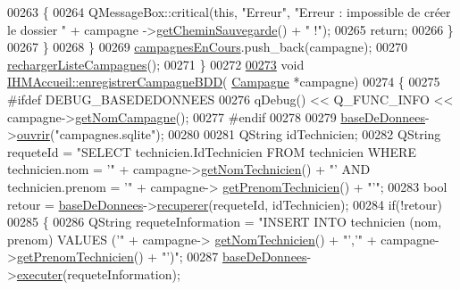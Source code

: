 \begin{DoxyCode}
{00263             \{
00264                 QMessageBox::critical(\textcolor{keyword}{this}, \textcolor{stringliteral}{"Erreur"}, \textcolor{stringliteral}{"Erreur : impossible de créer le dossier "} + campagne
      ->\hyperlink{class_campagne_ad752790357417d83a93056d9c9689a16}{getCheminSauvegarde}() + \textcolor{stringliteral}{" !"});
00265                 \textcolor{keywordflow}{return};
00266             \}
00267         \}
00268     \}
00269     \hyperlink{class_i_h_m_accueil_ad3827b81480eb201b5927c16a2ad1c46}{campagnesEnCours}.push\_back(campagne);
00270     \hyperlink{class_i_h_m_accueil_a44074f2d8d59e0d1b7a3d50c24d2a0df}{rechargerListeCampagnes}();
00271 \}
00272 
\hyperlink{class_i_h_m_accueil_a5ab04fc3fa87817bec130f377d563b75}{00273} \textcolor{keywordtype}{void} \hyperlink{class_i_h_m_accueil_a5ab04fc3fa87817bec130f377d563b75}{IHMAccueil::enregistrerCampagneBDD}(
      \hyperlink{class_campagne}{Campagne} *campagne)
00274 \{
00275 \textcolor{preprocessor}{    #ifdef DEBUG\_BASEDEDONNEES}
00276     qDebug() << Q\_FUNC\_INFO << campagne->\hyperlink{class_campagne_a99a682fcb8e5a3f8c2aff7a44eb2c930}{getNomCampagne}();
00277 \textcolor{preprocessor}{    #endif}
00278 
00279     \hyperlink{class_i_h_m_accueil_ab56d9846c071396a92f88272880e2c1f}{baseDeDonnees}->\hyperlink{class_base_de_donnees_a7f6a5510b08017b0d99115a84252f186}{ouvrir}(\textcolor{stringliteral}{"campagnes.sqlite"});
00280 
00281     QString idTechnicien;
00282     QString requeteId = \textcolor{stringliteral}{"SELECT technicien.IdTechnicien FROM technicien WHERE technicien.nom = '"} + 
      campagne->\hyperlink{class_campagne_ae1df1bd6234222ccdaf5a1d20d64ee46}{getNomTechnicien}() + \textcolor{stringliteral}{"' AND technicien.prenom = '"} + campagne->
      \hyperlink{class_campagne_ac6c7772ef5d7b15964664d659b486263}{getPrenomTechnicien}() + \textcolor{stringliteral}{"'"};
00283     \textcolor{keywordtype}{bool} retour = \hyperlink{class_i_h_m_accueil_ab56d9846c071396a92f88272880e2c1f}{baseDeDonnees}->\hyperlink{class_base_de_donnees_a77539baad389f5acf754cd2cd452403e}{recuperer}(requeteId, idTechnicien);
00284     \textcolor{keywordflow}{if}(!retour)
00285     \{
00286         QString requeteInformation = \textcolor{stringliteral}{"INSERT INTO technicien (nom, prenom) VALUES ('"} + campagne->
      \hyperlink{class_campagne_ae1df1bd6234222ccdaf5a1d20d64ee46}{getNomTechnicien}() + \textcolor{stringliteral}{"','"} + campagne->\hyperlink{class_campagne_ac6c7772ef5d7b15964664d659b486263}{getPrenomTechnicien}() + \textcolor{stringliteral}{"')"};
00287         \hyperlink{class_i_h_m_accueil_ab56d9846c071396a92f88272880e2c1f}{baseDeDonnees}->\hyperlink{class_base_de_donnees_aa8de5f8f8bb17edc43f5c0ee33712081}{executer}(requeteInformation);
}
\end{DoxyCode}
